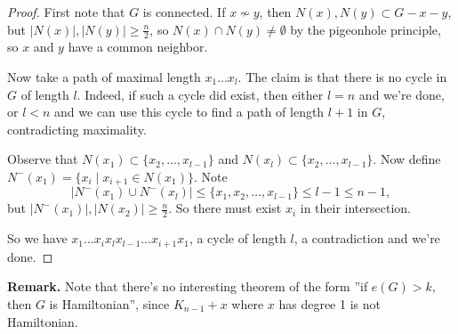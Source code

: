 \documentclass{article}
\theoremstyle{definition}
\begin{document}
\begin{proof}
    First note that $G$ is connected. If $x \not\sim y$, then $N(x), N(y) \subset G-x-y$, but $|N(x)|,|N(y)|\ge \frac{n}{2}$, so $N(x) \cap N(y) \neq \emptyset$ by the pigeonhole principle, so $x$ and $y$ have a common neighbor.
    \vspace{1mm}
    
    Now take a path of maximal length $x_1\ldots x_l$. The claim is that there is no cycle in $G$ of length $l$. Indeed, if such a cycle did exist, then either $l=n$ and we're done, or $l<n$ and we can use this cycle to find a path of length $l+1$ in $G$, contradicting maximality.
    \vspace{1mm}
    
    Observe that $N(x_1) \subset \{x_2,\ldots,x_{l-1}\}$ and $N(x_l) \subset \{x_2,\ldots,x_{l-1}\}$. Now define $N^-(x_1) = \{x_i \mid x_{i+1} \in N(x_1)\}$. Note $$|N^-(x_1) \cup N^-(x_l)| \le \{x_1,x_2,\ldots,x_{l-1}\}\le l-1\le n-1,$$ 
    but $|N^-(x_1)|,|N(x_2)| \ge \frac{n}{2}$. So there must exist $x_i$ in their intersection.
    \vspace{1mm}
    
    So we have $x_1 \ldots x_{i} x_l x_{l-1} \ldots x_{i+1} x_1$, a cycle of length $l$, a contradiction and we're done.
\end{proof}
\textbf{Remark.} Note that there's no interesting theorem of the form ''if $e(G) > k$, then $G$ is Hamiltonian'', since $K_{n-1} + x$ where $x$ has degree 1 is not Hamiltonian.
\end{document}
